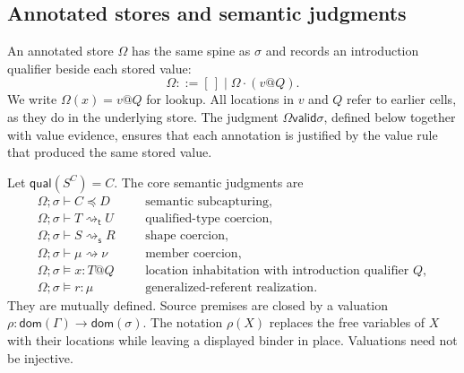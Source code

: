 \documentclass[acmsmall,screen,nonacm]{acmart}
\newcommand{\capt}[2]{#1^{#2}}
\newcommand{\tcoerce}{\mathrel{\rightsquigarrow_{\mathsf t}}}
\newcommand{\scoerce}{\mathrel{\rightsquigarrow_{\mathsf s}}}
\newcommand{\coerce}{\mathrel{\rightsquigarrow}}
\newcommand{\semleq}{\mathrel{\preceq}}
\newcommand{\qual}{\mathsf{qual}}
\newcommand{\valid}{\mathrel{\mathsf{valid}}}
\newcommand{\rulesetup}{%
  \small
  \smallrulenames
  \setlength{\afterruleskip}{1.45em plus 0.2em minus 0.1em}%
  \setlength{\labelminsep}{0.65em}%
  \renewcommand{\arraystretch}{1.15}%
  \renewcommand{\andalso}{\qquad}%
}
\begin{document}
\subsection{Annotated stores and semantic judgments}

An annotated store \(\Omega\) has the same spine as \(\sigma\) and records an
introduction qualifier beside each stored value:
\[
  \Omega ::= [\,] \mid \Omega\mathbin{\cdot}(v@Q).
\]
We write \(\Omega(x)=v@Q\) for lookup.  All locations in \(v\) and \(Q\)
refer to earlier cells, as they do in the underlying store.  The judgment
\(\Omega\valid\sigma\), defined below together with value evidence, ensures
that each annotation is justified by the value rule that produced the same
stored value.

Let \(\qual(\capt S C)=C\).  The core semantic judgments are
\[
\begin{array}{rcll}
 \Omega;\sigma\vdash C\semleq D
   &&& \text{semantic subcapturing},\\
 \Omega;\sigma\vdash T\tcoerce U
   &&& \text{qualified-type coercion},\\
 \Omega;\sigma\vdash S\scoerce R
   &&& \text{shape coercion},\\
 \Omega;\sigma\vdash\mu\coerce\nu
   &&& \text{member coercion},\\
 \Omega;\sigma\models x:T@Q
   &&& \text{location inhabitation with introduction qualifier }Q,\\
 \Omega;\sigma\models r:\mu
   &&& \text{generalized-referent realization}.
\end{array}
\]
They are mutually defined.  Source premises are closed by a valuation
\(\rho:\mathsf{dom}(\Gamma)\to\mathsf{dom}(\sigma)\).  The notation
\(\rho(X)\) replaces the free variables of \(X\) with their locations while
leaving a displayed binder in place.  Valuations need not be injective.

\clearpage
\begingroup
\setlength{\abovedisplayskip}{5pt plus 1pt minus 1pt}
\setlength{\belowdisplayskip}{5pt plus 1pt minus 1pt}
\setlength{\intextsep}{5pt}
\captionsetup{skip=6pt}
\rulesetup
\end{document}
